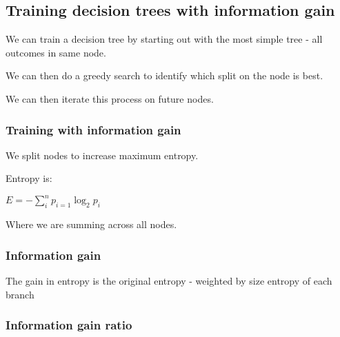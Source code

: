 
\subsection{Training decision trees with information gain}

We can train a decision tree by starting out with the most simple tree - all outcomes in same node.

We can then do a greedy search to identify which split on the node is best.

We can then iterate this process on future nodes.

\subsubsection{Training with information gain}

We split nodes to increase maximum entropy.

Entropy is:

\(E= -\sum_i^n p_{i=1}\log_2 p_i\)

Where we are summing across all nodes.

\subsubsection{Information gain}

The gain in entropy is the original entropy - weighted by size entropy of each branch

\subsubsection{Information gain ratio}

